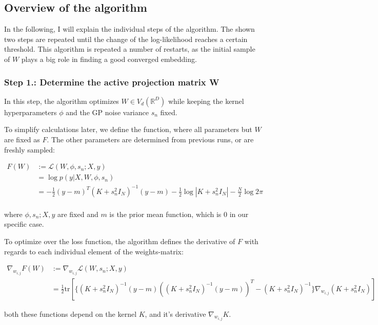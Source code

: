 \subsection{Overview of the algorithm}

In the following, I will explain the individual steps of the algorithm.
The shown two steps are repeated until the change of the log-likelihood reaches a certain threshold.
This algorithm is repeated a number of restarts, as the initial sample of $W$ plays a big role in finding a good converged embedding.

\subsubsection{Step 1.: Determine the active projection matrix W}
In this step, the algorithm optimizes $W \in V_d(\mathbb{R}^D)$ while keeping the kernel hyperparameters $\phi$ and the GP noise variance $s_n$ fixed.

To simplify calculations later, we define the function, where all parameters but $W$ are fixed as $F$. 
The other parameters are determined from previous runs, or are freshly sampled:

\begin{align}
F(W) &:= \mathcal{L}(W, \phi, s_n; X, y) \\
& = \log p(y | X, W, \phi, s_n) \\
& =  -\frac{1}{2} (y - m)^T (K + s_n^2 I_N)^{-1} (y - m) -\frac{1}{2} \log|K + s_n^2 I_N| -\frac{N}{2} \log 2 \pi   \\
\end{align}

where $\phi, s_n; X, y$ are fixed and $m$ is the prior mean function, which is 0 in our specific case.

To optimize over the loss function, the algorithm defines the derivative of $F$ with regards to each individual element of the weights-matrix:

\begin{align}
\nabla_{w_{i,j}} F(W) &:= \nabla_{w_{i,j}} \mathcal{L}(W, s_n; X, y) \\
& = \frac{1}{2} \text{tr} \left[ \{ (K + s_n^2 I_N)^{-1} (y-m) \left( (K + s_n^2 I_N)^{-1} (y-m) \right)^T - (K + s_n^2 I_N)^{-1} \} \nabla_{w_{i,j}} (K + s_n^2 I_N) \right]
\end{align}

both these functions depend on the kernel $K$, and it's derivative $\nabla_{w_{i,j}} K$. \\

